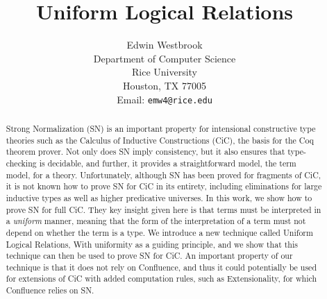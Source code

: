 \documentclass{article}
\begin{document}




\title{Uniform Logical Relations}

\iftechreport
\author{Edwin Westbrook\\
Department of Computer Science\\
Rice University\\
Houston, TX 77005\\
Email: \texttt{emw4@rice.edu}}

\else
\author{
}
\fi

\maketitle

\begin{abstract}
  Strong Normalization (SN) is an important property for intensional
  constructive type theories such as the Calculus of Inductive
  Constructions (CiC), the basis for the Coq theorem prover. Not only
  does SN imply consistency, but it also ensures that type-checking is
  decidable, and further, it provides a straightforward model, the
  term model, for a theory. Unfortunately, although SN has been proved
  for fragments of CiC, it is not known how to prove SN for CiC in its
  entirety, including eliminations for large inductive types as well
  as higher predicative universes. In this work, we show how to prove
  SN for full CiC. They key insight given here is that terms must be
  interpreted in a \emph{uniform} manner, meaning that the form of the
  interpretation of a term must not depend on whether the term is a
  type. We introduce a new technique called Uniform Logical Relations,
  With uniformity as a guiding principle, and we show that this
  technique can then be used to prove SN for CiC. An important
  property of our technique is that it does not rely on Confluence,
  and thus it could potentially be used for extensions of CiC with
  added computation rules, such as Extensionality, for which
  Confluence relies on SN.
\end{abstract}
\end{document}
